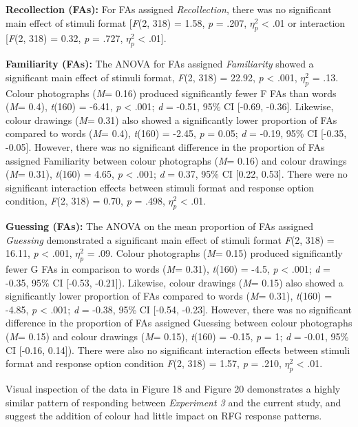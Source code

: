 \documentclass[
  11pt,
]{article}
\begin{document}
\textbf{Recollection (FAs):} For FAs assigned \emph{Recollection}, there
was no significant main effect of stimuli format {[}\emph{F}(2, 318) =
1.58, \emph{p} = .207, \(\eta^2_p\) \textless{} .01 or interaction
{[}\emph{F}(2, 318) = 0.32, \emph{p} = .727, \(\eta^2_p\) \textless{}
.01{]}.

\textbf{Familiarity (FAs):} The ANOVA for FAs assigned
\emph{Familiarity} showed a significant main effect of stimuli format,
\emph{F}(2, 318) = 22.92, \emph{p} \textless{} .001, \(\eta^2_p\) = .13.
Colour photographs (\emph{M}= 0.16) produced significantly fewer F FAs
than words (\emph{M}= 0.4), \emph{t}(160) = -6.41, \emph{p} \textless{}
.001; \emph{d} = -0.51, 95\% CI {[}-0.69, -0.36{]}. Likewise, colour
drawings (\emph{M}= 0.31) also showed a significantly lower proportion
of FAs compared to words (\emph{M}= 0.4), \emph{t}(160) = -2.45,
\emph{p} = 0.05; \emph{d} = -0.19, 95\% CI {[}-0.35, -0.05{]}. However,
there was no significant difference in the proportion of FAs assigned
Familiarity between colour photographs (\emph{M}= 0.16) and colour
drawings (\emph{M}= 0.31), \emph{t}(160) = 4.65, \emph{p} \textless{}
.001; \emph{d} = 0.37, 95\% CI {[}0.22, 0.53{]}. There were no
significant interaction effects between stimuli format and response
option condition, \emph{F}(2, 318) = 0.70, \emph{p} = .498, \(\eta^2_p\)
\textless{} .01.

\textbf{Guessing (FAs):} The ANOVA on the mean proportion of FAs
assigned \emph{Guessing} demonstrated a significant main effect of
stimuli format \emph{F}(2, 318) = 16.11, \emph{p} \textless{} .001,
\(\eta^2_p\) = .09. Colour photographs (\emph{M}= 0.15) produced
significantly fewer G FAs in comparison to words (\emph{M}= 0.31),
\emph{t}(160) = -4.5, \emph{p} \textless{} .001; \emph{d} = -0.35, 95\%
CI {[}-0.53, -0.21{]}). Likewise, colour drawings (\emph{M}= 0.15) also
showed a significantly lower proportion of FAs compared to words
(\emph{M}= 0.31), \emph{t}(160) = -4.85, \emph{p} \textless{} .001;
\emph{d} = -0.38, 95\% CI {[}-0.54, -0.23{]}. However, there was no
significant difference in the proportion of FAs assigned Guessing
between colour photographs (\emph{M}= 0.15) and colour drawings
(\emph{M}= 0.15), \emph{t}(160) = -0.15, \emph{p} = 1; \emph{d} = -0.01,
95\% CI {[}-0.16, 0.14{]}). There were also no significant interaction
effects between stimuli format and response option condition \emph{F}(2,
318) = 1.57, \emph{p} = .210, \(\eta^2_p\) \textless{} .01.

Visual inspection of the data in Figure 18 and Figure 20 demonstrates a
highly similar pattern of responding between \emph{Experiment 3} and the
current study, and suggest the addition of colour had little impact on
RFG response patterns.
\end{document}
